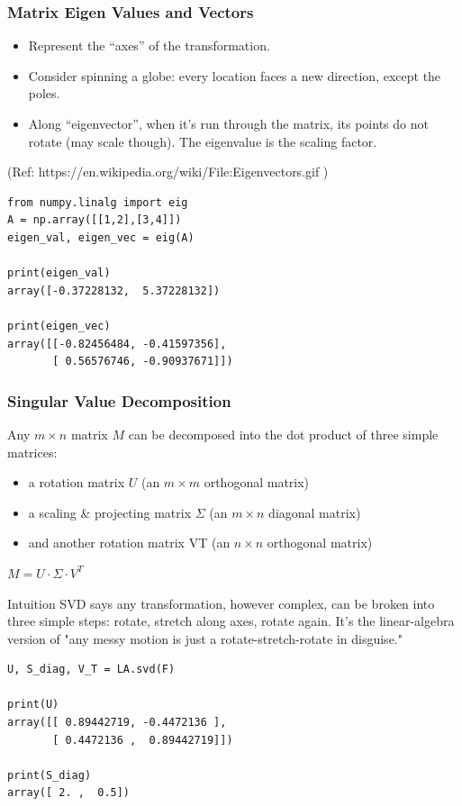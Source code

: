  \begin{frame}[fragile] \frametitle{Matrix Eigen Values and Vectors}

\begin{itemize}
\item Represent the “axes” of the transformation.
\item Consider spinning a globe: every location faces a new direction, except the poles.
\item Along ``eigenvector'', when it's run through the matrix, its points do not rotate (may scale though). The eigenvalue is the scaling factor.
\end{itemize}

{\tiny (Ref: https://en.wikipedia.org/wiki/File:Eigenvectors.gif )}

\begin{lstlisting}
from numpy.linalg import eig
A = np.array([[1,2],[3,4]])
eigen_val, eigen_vec = eig(A)

print(eigen_val)
array([-0.37228132,  5.37228132])

print(eigen_vec)
array([[-0.82456484, -0.41597356],
       [ 0.56576746, -0.90937671]])
\end{lstlisting}

\end{frame}


 \begin{frame}[fragile] \frametitle{Singular Value Decomposition}

Any $m \times n$  matrix $M$ can be decomposed into the dot product of three simple matrices:
\begin{itemize}
\item a rotation matrix $U$  (an $m \times m$ orthogonal matrix)
\item a scaling \& projecting matrix $\Sigma$ (an $m \times n$ diagonal matrix)
\item and another rotation matrix  VT  (an $n \times n$ orthogonal matrix)
\end{itemize}

$M = U \cdot \Sigma \cdot V^{T}$

\begin{block}{Intuition}
SVD says any transformation, however complex, can be broken into three simple steps: rotate, stretch along axes, rotate again. It's the linear-algebra version of "any messy motion is just a rotate-stretch-rotate in disguise."
\end{block}

\begin{lstlisting}
U, S_diag, V_T = LA.svd(F)

print(U)
array([[ 0.89442719, -0.4472136 ],
       [ 0.4472136 ,  0.89442719]])
			 
print(S_diag)
array([ 2. ,  0.5])
\end{lstlisting}

\end{frame}
